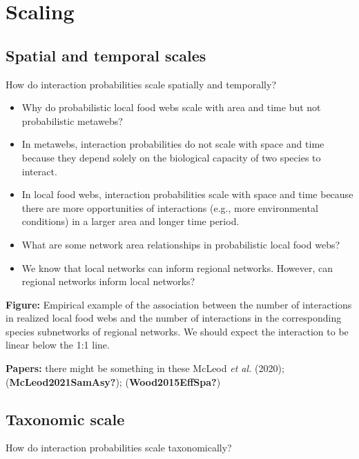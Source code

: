 \documentclass[11pt]{article}
\begin{document}
\hypertarget{scaling}{%
\section{Scaling}\label{scaling}}

\hypertarget{spatial-and-temporal-scales}{%
\subsection{Spatial and temporal
scales}\label{spatial-and-temporal-scales}}

How do interaction probabilities scale spatially and temporally?

\begin{itemize}
\tightlist
\item
  Why do probabilistic local food webs scale with area and time but not
  probabilistic metawebs?
\item
  In metawebs, interaction probabilities do not scale with space and
  time because they depend solely on the biological capacity of two
  species to interact.
\item
  In local food webs, interaction probabilities scale with space and
  time because there are more opportunities of interactions (e.g., more
  environmental conditions) in a larger area and longer time period.
\item
  What are some network area relationships in probabilistic local food
  webs?
\item
  We know that local networks can inform regional networks. However, can
  regional networks inform local networks?
\end{itemize}

\textbf{Figure:} Empirical example of the association between the number
of interactions in realized local food webs and the number of
interactions in the corresponding species subnetworks of regional
networks. We should expect the interaction to be linear below the 1:1
line.

\textbf{Papers:} there might be something in these McLeod \emph{et al.}
(2020); (\textbf{McLeod2021SamAsy?}); (\textbf{Wood2015EffSpa?})

\hypertarget{taxonomic-scale}{%
\subsection{Taxonomic scale}\label{taxonomic-scale}}

How do interaction probabilities scale taxonomically?
\end{document}

